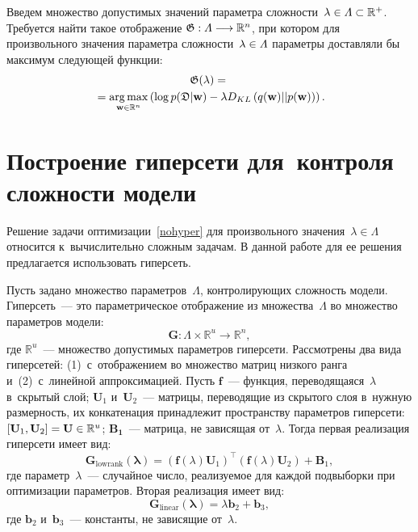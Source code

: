 \begin{multicols}{2}
Введем множество допустимых значений параметра сложности~$\lambda \hm\in \varLambda 
\hm\subset \mathbb{R}^+$.
Требуется найти такое отображение $\mathfrak{G}:\varLambda \hm\longrightarrow 
\mathbb{R}^n$, при котором для произвольного значения параметра 
сложности~$\lambda \hm\in \varLambda$  параметры доставляли бы максимум сле\-ду\-ющей 
функции:
\begin{multline}
\label{nohyper}
\mathfrak{G}(\lambda) ={}\\
{}=
 \mathop{\mathrm{arg}\,\mathrm{max}}\limits_{\mathbf{w} \in \mathbb{R}^n} \left( \log 
p(\mathfrak{D}| \mathbf{w})  - \lambda 
D_{KL}\left(q(\mathbf{w})||p(\mathbf{w})\right)\right).
\end{multline}

\section{Построение гиперсети для~контроля сложности модели}

Решение задачи оптимизации~\eqref{nohyper} для произвольного значения~$\lambda 
\in \varLambda$ относится к~вычислительно сложным задачам. В данной работе для 
ее решения предлагается использовать гиперсеть.

Пусть задано множество параметров~$\Lambda$, контролирующих сложность модели. 
Гиперсеть~--- это параметрическое отображение из множества~$\Lambda$ во 
множество параметров модели:
$$
 \mathbf{G}: \Lambda \times \mathbb{R}^u \to \mathbb{R}^n,
 $$
где $\mathbb{R}^u$~--- множество допустимых параметров гиперсети.
Рассмотрены два вида гиперсетей: (1)~с~отоб\-ра\-же\-ни\-ем во множество мат\-риц низкого 
ранга и~(2)~с~линейной аппроксимацией.
Пусть $\mathbf{f}$~--- функция, переводящаяся~$\lambda$ в~скрытый слой;
$\mathbf{U}_1$ и~$\mathbf{U}_2$~--- матрицы, переводящие из скрытого слоя в~нужную 
размерность, их конкатенация принадлежит пространству параметров гиперсети: 
$[\mathbf{U}_1, \mathbf{U}_2] \hm= \mathbf{U} \hm\in \mathbb{R}^u$; $\mathbf{B_1}$~--- 
матрица, не зависящая от~$\lambda$. Тогда первая реализация гиперсети имеет вид:
\begin{equation}
\label{hyper1}
\mathbf{G}_{\mathrm{lowrank}}(\mathbf{\lambda})=
(\mathbf{f}(\lambda)\mathbf{U}_1)^\top (\mathbf{f} (\lambda) \mathbf{U}_2) + 
\mathbf{B}_1,
\end{equation}
где параметр~$\lambda$~--- случайное число, реализуемое для каждой подвыборки 
при оптимизации параметров. Вторая реализация имеет вид:
\begin{equation}
\label{hyper2}
\mathbf{G}_{\mathrm{linear}}(\mathbf{\lambda})= \lambda\mathbf{b}_2 + \mathbf{b}_3,
\end{equation}
где $\mathbf{b}_2$ и~$\mathbf{b}_3$~--- константы, не зависящие от~$\lambda$.


\end{multicols}
